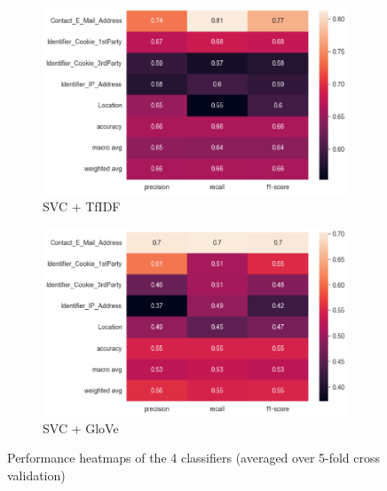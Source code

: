 \begin{figure}[!ht]
	\begin{subfigure}[t]{.5\textwidth}
	  \centering
	  \includegraphics[width=\linewidth]{figures/heatmap_svc_tfidf.png}
	  \caption{SVC + TfIDF}
	\end{subfigure}
	\hfill
	\begin{subfigure}[t]{.5\textwidth}
	  \centering
	  \includegraphics[width=\linewidth]{figures/heatmap_svc_glove.png}
	  \caption{SVC + GloVe}
	\end{subfigure}
	\caption{Performance heatmaps of the 4 classifiers (averaged over 5-fold cross validation)}
	\label{fig:heatmaps_perf}
  \end{figure}

